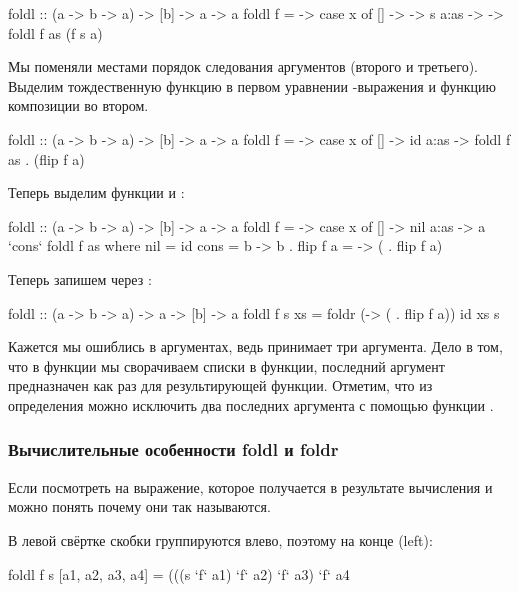 \begin{code}
foldl :: (a -> b -> a) -> [b] -> a -> a
foldl f = \x -> case x of    
    []      -> \s -> s
    a:as    -> \s -> foldl f as (f s a)
\end{code}

Мы поменяли местами порядок следования аргументов
(второго и третьего). Выделим тождественную функцию 
в первом уравнении -выражения и функцию
композиции во втором. 


\begin{code}
foldl :: (a -> b -> a) -> [b] -> a -> a
foldl f = \x -> case x of    
    []      -> id
    a:as    -> foldl f as . (flip f a)
\end{code}

Теперь выделим функции  и :

\begin{code}
foldl :: (a -> b -> a) -> [b] -> a -> a
foldl f = \x -> case x of    
    []      -> nil 
    a:as    -> a `cons` foldl f as 
    where nil   = id
          cons  = \a b -> b . flip f a
                = \a   -> ( . flip f a)
\end{code}

Теперь запишем через :

\begin{code}
foldl :: (a -> b -> a) -> a -> [b] -> a
foldl f s xs = foldr (\a -> ( . flip f a)) id xs s
\end{code}

Кажется мы ошиблись в аргументах, ведь 
принимает три аргумента. Дело в том, что в функции
 мы сворачиваем списки в функции, последний
аргумент предназначен как раз для результирующей функции.
Отметим, что из определения можно исключить два последних
аргумента с помощью функции . 

\subsubsection{Вычислительные особенности foldl и foldr}

Если посмотреть на выражение, которое получается в 
результате вычисления  и  можно
понять почему они так называются. 

В левой свёртке  скобки группируются влево, поэтому 
на конце  (left):

\begin{code}
foldl f s [a1, a2, a3, a4] =
    (((s `f` a1) `f` a2) `f` a3) `f` a4
\end{code}

